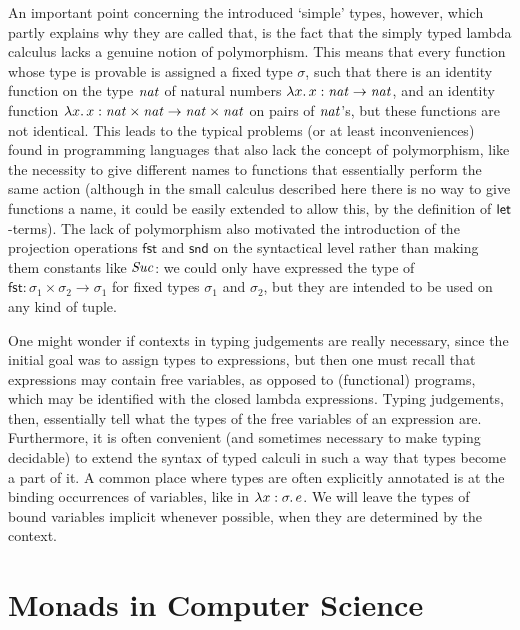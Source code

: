 An important point concerning the introduced `simple' types, however, which
partly explains why they are called that, is the fact that the simply typed
lambda calculus lacks a genuine notion of polymorphism. This means that every
function whose type is provable is assigned a fixed type $\sigma$, such that there is
an identity function on the type $\mathit{nat}$ of natural numbers
${\lambda x.\,x}: \mathit{nat}\to\mathit{nat}$, and an identity function
${\lambda x.\,x} : \mathit{nat}\times \mathit{nat} \to \mathit{nat} \times \mathit{nat}$ on pairs
of $\mathit{nat}$'s, but these functions are not identical.  This leads to the
typical problems (or at least inconveniences) found in programming languages
that also lack the concept of polymorphism, like the necessity to give different
names to functions that essentially perform the same action (although in the
small calculus described here there is no way to give functions a name, it could
be easily extended to allow this, \EG by the definition of $\mathsf{let}$-terms). The
lack of polymorphism also motivated the introduction of the projection
operations $\mathsf{fst}$ and $\mathsf{snd}$ on the syntactical level rather than
making them constants like $\mathit{Suc}$: we could only have expressed the type of
$\mathsf{fst} : \sigma_1\times\sigma_2 \to \sigma_1$ for fixed types $\sigma_1$ and $\sigma_2$, but they are
intended to be used on any kind of tuple.


One might wonder if contexts in typing judgements are really necessary, since the
initial goal was to assign types to expressions, but then one must recall that
expressions may contain free variables, as opposed to (functional) programs,
which may be identified with the closed lambda expressions. Typing judgements,
then, essentially tell what the types of the free variables of an expression
are. Furthermore, it is often convenient (and sometimes necessary to make typing
decidable) to extend the syntax of typed calculi in such a way that types become
a part of it. A common place where types are often explicitly annotated is at
the binding occurrences of variables, like in ${\lambda x:\mathit{\sigma}.\,e}$. We
will leave the types of bound variables implicit whenever possible, \IE when
they are determined by the context.



\section{Monads in Computer Science}
\label{sec:monads-cs}


